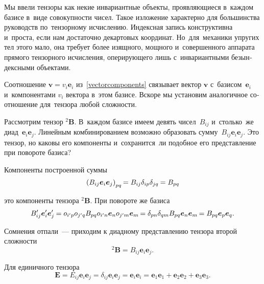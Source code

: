 \begin{otherlanguage}{russian}

Мы ввели тензоры как некие инвариантные объекты, проявляющиеся в~каждом базисе в~виде совокупности чисел. Такое изложение характерно для большинства руководств по~тензорному исчислению. Индексная запись конструктивна и~проста, если нам достаточно декартовых координат. Но~для~механики упругих тел этого мало, она требует более изящного, мощного и~совершенного аппарата прямого тензорного исчисления, оперирующего лишь с~инвариантными безындексными объектами.

Соотношение ${\bm{v} = v_i \bm{e}_i}$ из~\eqref{vectorcomponents} связывает вектор ${\bm{v}}$ с~базисом~${\bm{e}_i}$ и~компонентами ${v_i}$ вектора в~этом базисе. Вскоре мы установим аналогичное соотношение для~тензора любой сложности.

Рассмотрим тензор ${^2\!\bm{B}}$. В~каждом базисе имеем девять чисел~${B_{ij}}$ и~столько~же диад~${\bm{e}_i \bm{e}_j}$. Линейным комбинированием возможно образовать сумму~${B_{ij} \bm{e}_i \bm{e}_j}$. Это тензор, но каковы его компоненты и~сохранится~ли подобное его представление при повороте базиса?

Компоненты построенной суммы
\[
\left( B_{ij} \bm{e}_i \bm{e}_j \right)_{pq} \hspace{-0.2ex} = B_{ij} \delta_{ip} \delta_{jq} \hspace{-0.1ex} = B_{pq}
\]

\vspace{-0.1em} \noindent это компоненты тензора ${^2\!\bm{B}}$. При повороте же базиса
\[
B'_{ij} \bm{e}'_{i} \bm{e}'_{j} \hspace{-0.1ex} = o_{i'p} o_{j'q} B_{pq} o_{i'n} \bm{e}_n o_{j'm} \bm{e}_m \hspace{-0.2ex} = \delta_{pn} \delta_{qm} B_{pq} \bm{e}_n \bm{e}_m \hspace{-0.2ex} = B_{pq} \bm{e}_p \bm{e}_q.
\]

Сомнения отпали~--- приходим к диадному представлению тензора второй сложности
\begin{equation}\label{polyada:2}
^2\!\bm{B} = B_{ij} \bm{e}_i \bm{e}_j .
\end{equation}

\vspace{-0.2em} Для единичного тензора
\[ \bm{E} = E_{ij} \bm{e}_i \bm{e}_j = \delta_{ij} \bm{e}_i \bm{e}_j = \bm{e}_i \bm{e}_i = \bm{e}_1 \bm{e}_1 + \bm{e}_2 \bm{e}_2 + \bm{e}_3 \bm{e}_3. \]


\end{otherlanguage}

